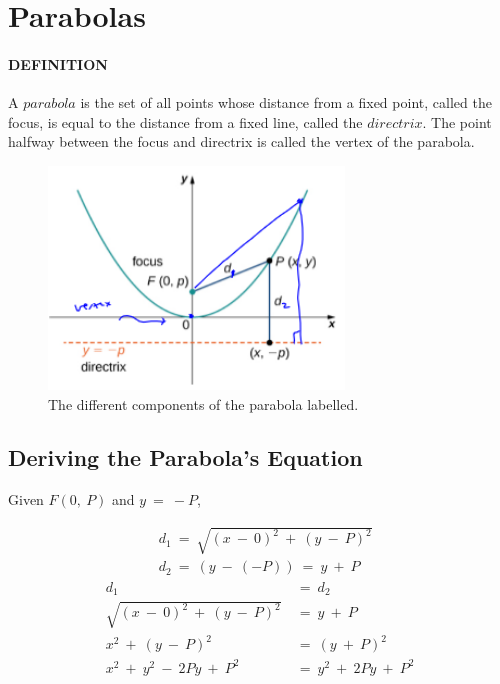 \documentclass{article}
\newcommand{\highlight}[1]{%
  \colorbox{yellowOrange}{$\displaystyle#1$}}
\begin{document}
\newpage
\section{Parabolas}

\paragraph{DEFINITION} A \highlight{parabola} is the set of all points whose distance from a fixed point, called the focus, is equal to the distance from a fixed line, called the \highlight{directrix}. The point halfway between the focus and directrix is called the vertex of the parabola.

\begin{figure}[H]
  \includegraphics[width=0.7\textwidth,center]{Parabola.png}
  \caption{The different components of the parabola labelled.}
  \label{fig:parabola1}
\end{figure}

\subsection{Deriving the Parabola's Equation}

Given $F(0,\ P)$ and $y\ =\ -P$,

\begin{align*}
  &d_1\ =\ \sqrt{(x\ -\ 0)^2\ +\ (y\ -\ P)^2}\\
  &d_2\ =\ (y\ -\ (-P))\ =\ y\ +\ P
\end{align*}
\begin{align*}
  d_1\ &=\ d_2\\
  \sqrt{(x\ -\ 0)^2\ +\ (y\ -\ P)^2}\ &=\ y\ +\ P\\
  x^2\ +\ (y\ -\ P)^2\ &=\ (y\ +\ P)^2\\
  x^2\ +\ y^2\ -\ 2Py\ +\ P^2\ &=\ y^2\ +\ 2Py\ +\ P^2
\end{align*}
\end{document}
